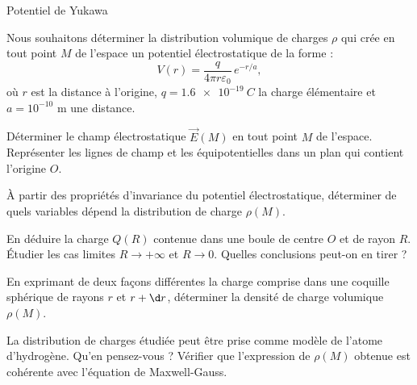 \begin{exo}[PT][2][TD]{Potentiel de Yukawa}

Nous souhaitons déterminer la distribution volumique de charges $\rho$ qui crée en tout point $M$ de l'espace un potentiel électrostatique de la forme :
\begin{equation}
 V(r) = \frac{q}{4\pi r \varepsilon_{0}}\,e^{-r/a},
\end{equation}
où $r$ est la distance à l'origine, $q = \SI{1.6e-19}{C}$ la charge élémentaire et $a=10^{-10}$ m une distance.%

\begin{quest}
 \item Déterminer le champ électrostatique $\Vec{E}(M)$ en tout point $M$ de l'espace. Représenter les lignes de champ et les équipotentielles dans un plan qui contient l'origine $O$.


 \item À partir des propriétés d'invariance du potentiel électrostatique, déterminer de quels variables dépend la distribution de charge $\rho(M)$.

 \item En déduire la charge $Q(R)$ contenue dans une boule de centre $O$ et de rayon $R$.
 \'Etudier les cas limites $R \rightarrow +\infty$ et $R \rightarrow 0$. Quelles conclusions peut-on en tirer ?

 \item En exprimant de deux façons différentes la charge comprise dans une coquille sphérique de rayons $r$ et $r+\d r$, déterminer la densité de charge volumique $\rho(M)$. 
 \item La distribution de charges étudiée peut être prise comme modèle de l'atome d'hydrogène. Qu'en pensez-vous ? Vérifier que l'expression de $\rho(M)$ obtenue est cohérente avec l'équation de Maxwell-Gauss.


\end{quest}
\end{exo}
